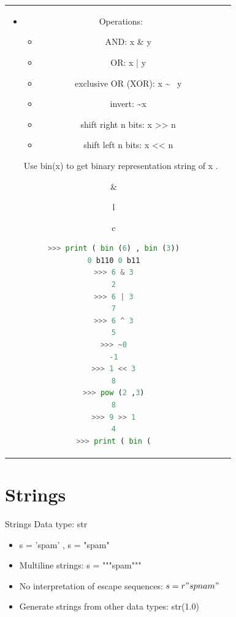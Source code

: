\documentclass[xcolor=dvipsnames,aspectratio=169]{beamer}
\begin{document}
\begin{frame}[fragile]
 \begin{tabular}{cc}
 \hspace*{-1.3cm} 
 \parbox{0.65\linewidth}{
\begin{itemize}
	\item Operations:
	\begin{itemize}
		\item AND: x \& y
		\item OR: x | y
		\item exclusive OR (XOR): x \textasciitilde~ y
		\item invert: \textasciitilde  x
		\item shift right n bits: x >> n
		\item shift left n bits: x << n
	\end{itemize}
Use bin(x) to get binary representation string of x .
\end{itemize} } 
& \begin{tabular}{l}
 \begin{tabular}{c}
 \hspace*{-1.1cm}
           \begin{lstlisting}[language=Python]
>>> print ( bin (6) , bin (3))
0 b110 0 b11
>>> 6 & 3
2
>>> 6 | 3
7
>>> 6 ^ 3
5
>>> ~0
-1
>>> 1 << 3
8
>>> pow (2 ,3)
8
>>> 9 >> 1
4
>>> print ( bin (
\end{lstlisting}
           \end{tabular}
\end{tabular}\\
\end{tabular}

\section{Strings}
\begin{frame}{Strings}
Data type: str
\begin{itemize}
	\item s = 'spam' , s = "spam"
	\item Multiline strings: s = """spam"""
	\item No interpretation of escape sequences: $s = r"sp nam"$
	\item Generate strings from other data types: str(1.0)
\end{itemize}

\end{frame}
\end{frame}
\end{document}
